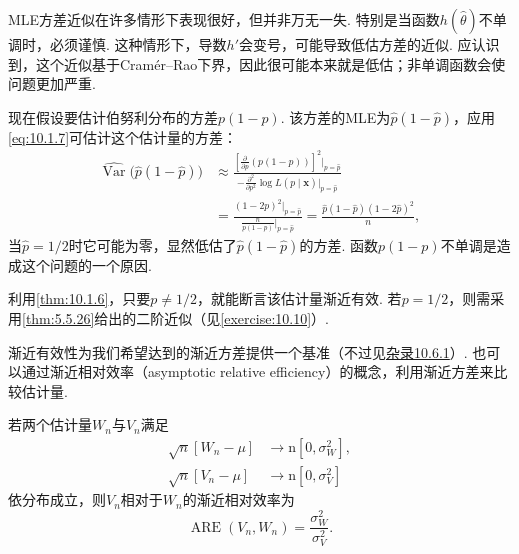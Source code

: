 MLE方差近似在许多情形下表现很好，但并非万无一失. 特别是当函数$h(\hat\theta)$不单调时，必须谨慎. 这种情形下，导数$h'$会变号，可能导致低估方差的近似. 应认识到，这个近似基于Cramér--Rao下界，因此很可能本来就是低估；非单调函数会使问题更加严重.

\begin{example}[续\autoref{ex:10.1.14}]\label{ex:10.1.15}
现在假设要估计伯努利分布的方差$p(1-p)$. 该方差的MLE为$\hat p(1-\hat p)$，应用\eqref{eq:10.1.7}可估计这个估计量的方差：
$$\begin{aligned}
\widehat{\operatorname{Var}}\bigl(\hat p(1-\hat p)\bigr)
&\approx\frac{\left[\frac\partial{\partial p}(p(1-p))\right]^2\big|_{p=\hat p}}{-\frac{\partial^2}{\partial p^2}\log L(p\mid\boldsymbol x)|_{p=\hat p}}\\
&=\frac{(1-2p)^2|_{p=\hat p}}{\frac n{p(1-p)}\big|_{p=\hat p}}
=\frac{\hat p(1-\hat p)(1-2\hat p)^2}n,
\end{aligned}$$
当$\hat p=1/2$时它可能为零，显然低估了$\hat p(1-\hat p)$的方差. 函数$p(1-p)$不单调是造成这个问题的一个原因.

利用\autoref{thm:10.1.6}，只要$p\ne1/2$，就能断言该估计量渐近有效. 若$p=1/2$，则需采用\autoref{thm:5.5.26}给出的二阶近似（见\autoref{exercise:10.10}）.
\end{example}

渐近有效性为我们希望达到的渐近方差提供一个基准（不过见\hyperref[sec:10.6.1]{杂录10.6.1}）. 也可以通过渐近相对效率（asymptotic relative efficiency）的概念，利用渐近方差来比较估计量.

\begin{definition}\label{def:10.1.16}
若两个估计量$W_n$与$V_n$满足
$$\begin{aligned}
\sqrt n[W_n-\mu]&\longrightarrow\mathrm n[0,\sigma_W^2],\\
\sqrt n[V_n-\mu]&\longrightarrow\mathrm n[0,\sigma_V^2]
\end{aligned}$$
依分布成立，则$V_n$相对于$W_n$的渐近相对效率为
$$\operatorname{ARE}(V_n,W_n)=\frac{\sigma_W^2}{\sigma_V^2}.$$
\end{definition}

